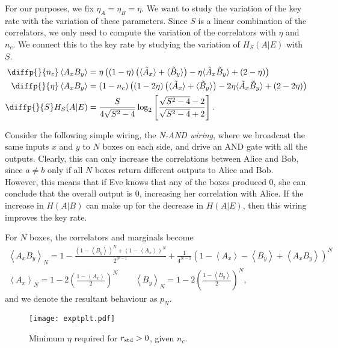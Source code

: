 \documentclass[10pt, a4paper]{article}
\numberwithin{equation}{section} %
\theoremstyle{definition}
\theoremstyle{plain}
\newcommand{\?}{\mathrel{?}} %
\newcommand{\angleb}[1]{\left\langle #1 \right\rangle} %
\newcommand{\std}{\rm std}
\begin{document}
      For our purposes, we fix \(\eta_A = \eta_B = \eta\). We want to study the variation of the key rate with the variation of these parameters. Since \(S\) is a linear combination of the correlators, we only need to compute the variation of the correlators with \(\eta\) and \(n_c\). We connect this to the key rate by studying the variation of \(H_S(A|E)\) with \(S\).
      \begin{align*}
        \diffp{}{{n_c}} \angleb{A_x B_y} &= \eta \left( \left(1-\eta\right) \left(\langle\tilde{A}_x\rangle + \langle\tilde{B}_y\rangle\right) - \eta \langle\tilde{A}_x\tilde{B}_y\rangle + \left(2 - \eta\right) \right) \\
        \diffp{}{{\eta}} \angleb{A_x B_y} &= \left(1 - n_{c}\right) \left( \left(1-2\eta\right) \left(\langle\tilde{A}_x\rangle+\langle\tilde{B}_y\rangle\right) - 2\eta \langle\tilde{A}_x\tilde{B}_y\rangle + (2-2\eta) \right) \\
        \diffp{}{S} H_S(A|E) &= \frac{S}{4\sqrt{S^2-4}} \log_2 \left[ \frac{\sqrt{S^2-4}-2}{\sqrt{S^2-4}+2} \right].
      \end{align*}

      Consider the following simple wiring, the \emph{N-AND wiring}, where we broadcast the same inputs \(x\) and \(y\) to \(N\) boxes on each side, and drive an AND gate with all the outputs. Clearly, this can only increase the correlations between Alice and Bob, since \(a \neq b\) only if all \(N\) boxes return different outputs to Alice and Bob. However, this means that if Eve knows that any of the boxes produced 0, she can conclude that the overall output is 0, increasing her correlation with Alice. If the increase in \(H(A|B)\) can make up for the decrease in \(H(A|E)\), then this wiring improves the key rate.

      For \(N\) boxes, the correlators and marginals become
      \begin{gather}
        \angleb{A_x B_y}_{N} = 1 - \frac{{(1-\angleb{B_y})}^N + {(1-\angleb{A_x})}^N}{2^{N-1}} + \frac{1}{4^{N-1}} {(1-\angleb{A_x} - \angleb{B_y} + \angleb{A_x B_y})}^{N} \\
        \angleb{A_x}_{N} = 1 - 2 {\left(\frac{1-\angleb{A_x}}{2}\right)}^N \qquad \angleb{B_y}_{N} = 1 - 2 {\left(\frac{1-\angleb{B_y}}{2}\right)}^N,
      \end{gather}
      and we denote the resultant behaviour as \(p_N\).

      \begin{figure}
        \centering
        \texttt{[image: exptplt.pdf]}
        \caption{\label{fig:exptplt} Minimum \(\eta\) required for \(r_{\std} > 0\), given \(n_c\).}
      \end{figure}
\end{document}
